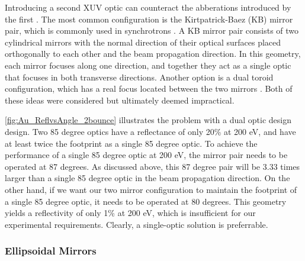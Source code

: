 Introducing a second XUV optic can counteract the abberations introduced by the first \cite{howellsMirrorsSynchrotronRadiationBeamlines1994}. The most common configuration is the Kirtpatrick-Baez (KB) mirror pair, which is commonly used in synchrotrons \cite{kirkpatrickFormationOpticalImages1948}. A KB mirror pair consists of two cylindrical mirrors with the normal direction of their optical surfaces placed orthogonally to each other and the beam propagation direction. In this geometry, each mirror focuses along one direction, and together they act as a single optic that focuses in both transverse directions. Another option is a dual toroid configuration, which has a real focus located between the two mirrors \cite{polettoMicrofocusingAttosecondPulses2013}. Both of these ideas were considered but ultimately deemed impractical.

\cref{fig:Au_ReflvsAngle_2bounce} illustrates the problem with a dual optic design design. Two 85 degree optics have a reflectance of only 20\% at 200 eV, and have at least twice the footprint as a single 85 degree optic. To achieve the performance of a single 85 degree optic at 200 eV, the mirror pair needs to be operated at 87 degrees. As discussed above, this 87 degree pair will be 3.33 times larger than a single 85 degree optic in the beam propagation direction. On the other hand, if we want our two mirror configuration to maintain the footprint of a single 85 degree optic, it needs to be operated at 80 degrees. This geometry yields a reflectivity of only 1\% at 200 eV, which is insufficient for our experimental requirements. Clearly, a single-optic solution is preferrable.

\subsubsection{Ellipsoidal Mirrors}

